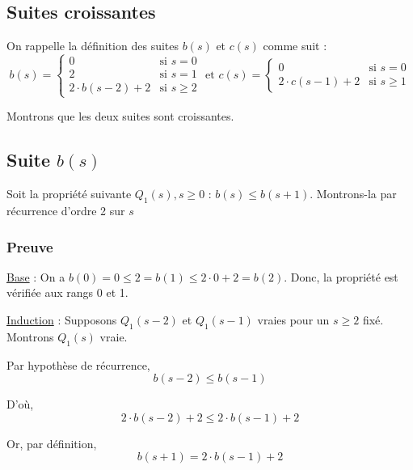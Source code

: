 \documentclass[12pt,a4paper]{article}
\begin{document}
 
\newpage
\begin{appendices}
 \section{Suites croissantes}
 \label{appendix:suites}
 On rappelle la d\'efinition des suites $b(s)$ et $c(s)$ comme suit :
\begin{equation*}
\left .b(s) = \begin{cases} 
      0 & \text{si } s = 0 \\
      2 & \text{si } s = 1 \\
      2\cdot b(s-2) + 2 & \text{si } s\geq 2 
   \end{cases} \right.
   \text{ et }
\left .c(s) = \begin{cases} 
      0 & \text{si } s = 0 \\
      2\cdot c(s-1) + 2 & \text{si } s\geq 1 
   \end{cases} \right.
\end{equation*}

Montrons que les deux suites sont croissantes.

\subsection*{Suite $b(s)$}
Soit la propri\'et\'e suivante $Q_{1}(s), s \geq 0$ : $b(s) \leq b(s+1)$.
Montrons-la par r\'ecurrence d'ordre 2 sur $s$

\subsubsection*{Preuve}
\underline{Base} : On a $b(0) = 0 \leq 2 = b(1) \leq 2\cdot 0 + 2 = b(2)$. 
Donc, la propri\'et\'e est v\'erifi\'ee aux rangs 0 et 1.

\medskip
\underline{Induction} : Supposons $Q_{1}(s-2)$ et $Q_{1}(s-1)$ vraies pour un $s \geq 2$ fix\'e. 
Montrons $Q_{1}(s)$ vraie.

\smallskip
Par hypoth\`ese de r\'ecurrence,
\begin{equation*}
   b(s-2) \leq b(s-1)
\end{equation*}

D'o\`u, 
\begin{equation}
   2\cdot b(s-2)+2 \leq 2\cdot b(s-1)+2 \label{eq:ineg_a1}
\end{equation}

Or, par d\'efinition, 
\begin{equation}
   b(s+1) = 2\cdot b(s-1) + 2 \label{eq:def_a1}
\end{equation}


\end{appendices}
\end{document}
